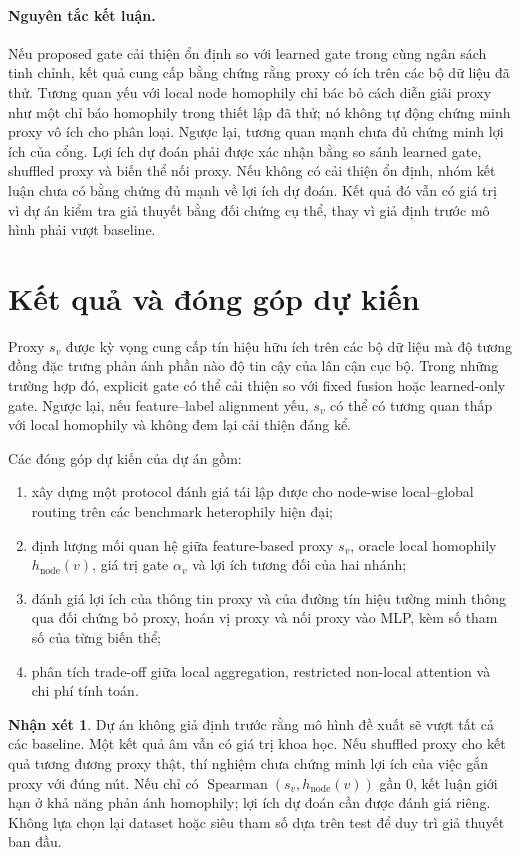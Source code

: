 \documentclass[12pt,a4paper]{article}
\numberwithin{equation}{section}
\theoremstyle{definition}
\newtheorem{remark}{Nhận xét}[section]
\DeclareMathOperator{\Spearman}{Spearman}
\begin{document}
\paragraph{Nguyên tắc kết luận.}
Nếu proposed gate cải thiện ổn định so với learned gate trong cùng ngân
sách tinh chỉnh, kết quả cung cấp bằng chứng rằng proxy có ích trên các
bộ dữ liệu đã thử. Tương quan yếu với local node homophily chỉ bác bỏ cách diễn giải proxy như một chỉ báo homophily trong thiết lập đã thử; nó không tự động chứng minh proxy vô ích cho phân loại. Ngược lại, tương quan mạnh chưa đủ chứng minh lợi ích của cổng. Lợi ích dự đoán phải được xác nhận bằng so sánh learned gate, shuffled proxy và biến thể nối proxy. Nếu không có cải thiện ổn định, nhóm kết luận chưa có bằng chứng đủ mạnh về lợi ích dự đoán. Kết quả đó vẫn có giá trị vì dự án kiểm tra giả thuyết bằng đối
chứng cụ thể, thay vì giả định trước mô hình phải vượt baseline.

\section{Kết quả và đóng góp dự kiến}
Proxy $s_v$ được kỳ vọng cung cấp tín hiệu hữu ích trên các bộ dữ liệu mà độ tương đồng đặc trưng phản ánh phần nào độ tin cậy của lân cận cục bộ. Trong những trường hợp đó, explicit gate có thể cải thiện so với fixed fusion hoặc learned-only gate. Ngược lại, nếu feature–label alignment yếu, $s_v$ có thể có tương quan thấp với local homophily và không đem lại cải thiện đáng kể.

Các đóng góp dự kiến của dự án gồm:
\begin{enumerate}
    \item xây dựng một protocol đánh giá tái lập được cho node-wise local–global routing trên các benchmark heterophily hiện đại;
    \item định lượng mối quan hệ giữa feature-based proxy $s_v$, oracle local homophily $h_{\text{node}}(v)$, giá trị gate $\alpha_v$ và lợi ích tương đối của hai nhánh;
    \item đánh giá lợi ích của thông tin proxy và của đường tín hiệu tường minh thông qua đối chứng bỏ proxy, hoán vị proxy và nối proxy vào MLP, kèm số tham số của từng biến thể;
    \item phân tích trade-off giữa local aggregation, restricted non-local attention và chi phí tính toán.
\end{enumerate}

\begin{remark}
Dự án không giả định trước rằng mô hình đề xuất sẽ vượt tất cả các baseline. Một kết quả âm vẫn có giá trị khoa học. Nếu shuffled proxy cho kết quả tương đương proxy thật, thí nghiệm chưa chứng minh lợi ích của việc gắn proxy với đúng nút. Nếu chỉ có $\Spearman(s_v,h_{\text{node}}(v))$ gần $0$, kết luận giới hạn ở khả năng phản ánh homophily; lợi ích dự đoán cần được đánh giá riêng. Không lựa chọn lại dataset hoặc siêu tham số dựa trên test để duy trì giả thuyết ban đầu.
\end{remark}
\end{document}
